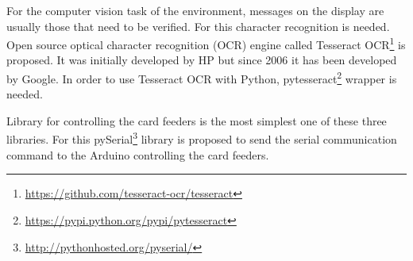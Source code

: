 For the computer vision task of the environment, messages on the display are usually those that need to be verified. For this character recognition is needed. Open source optical character recognition (OCR) engine called Tesseract OCR\footnote{\url{https://github.com/tesseract-ocr/tesseract}} is proposed. It was initially developed by HP but since 2006 it has been developed by Google. In order to use Tesseract OCR with Python, pytesseract\footnote{\url{https://pypi.python.org/pypi/pytesseract}} wrapper is needed.

Library for controlling the card feeders is the most simplest one of these three libraries. For this pySerial\footnote{\url{http://pythonhosted.org/pyserial/}} library is proposed to send the serial communication command to the Arduino controlling the card feeders.